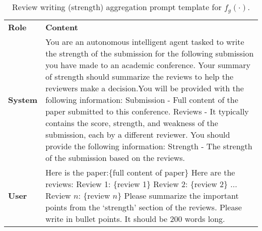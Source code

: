 \begin{table*}[ht]
\centering
\footnotesize
\renewcommand{\arraystretch}{1.3}
\begin{tabular}{p{1cm}p{11.5cm}}
\toprule[1.5pt]
\textbf{Role} & \textbf{Content} \\ 
\cmidrule[0.5pt](lr){1-2}
\textbf{System} & You are an autonomous intelligent agent tasked to write the strength of the submission for the following submission you have made to an academic conference. Your summary of strength should summarize the reviews to help the reviewers make a decision.\newline You will be provided with the following information: \newline Submission - Full content of the paper submitted to this conference. \newline Reviews - It typically contains the score, strength, and weakness of the submission, each by a different reviewer. \newline You should provide the following information: \newline Strength - The strength of the submission based on the reviews. \\ 
\midrule
\textbf{User} & Here is the paper:\newline \{full content of paper\}\newline
Here are the reviews:\newline
Review 1: \{review 1\}\newline
Review 2: \{review 2\}\newline
...\newline 
Review $n$: \{review $n$\}\newline
Please summarize the important points from the `strength' section of the reviews. \newline Please write in bullet points. It should be 200 words long. \\ 
\bottomrule[1.5pt]
\end{tabular}
\caption{Review writing (strength) aggregation prompt template for $f_g(\cdot)$.}
\label{tab:Agent_Metareview_Strength_Writing_Prompt}
\end{table*}

